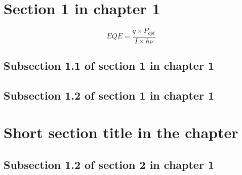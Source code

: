 \section{Section 1 in chapter 1}
\lipsum[2]

\begin{equation}
    EQE = \frac{q \times P_{opt}}{I \times h\nu}
\end{equation}

\lipsum[3-4]

\subsection{Subsection 1.1 of section 1 in chapter 1}
\lipsum[5-7]

\subsection{Subsection 1.2 of section 1 in chapter 1}
\lipsum[8-10]

\clearpage{} %
\section[Long section title displayed in the table of content]{Short section title in the chapter}
\lipsum[11-20]

\subsection{Subsection 1.2 of section 2 in chapter 1}
\lipsum[13-14]


{}
\specialsection %
\headerspecialsection

{\hypersetup{urlcolor=ntnu,linkcolor=sophia} %


}
